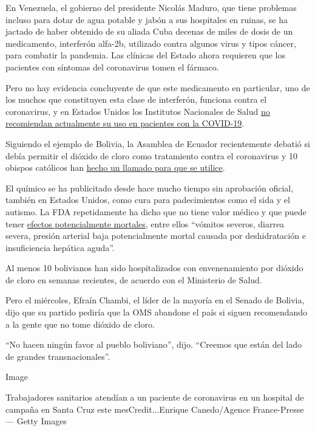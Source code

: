 En Venezuela, el gobierno del presidente Nicolás Maduro, que tiene
problemas incluso para dotar de agua potable y jabón a sus hospitales en
ruinas, se ha jactado de haber obtenido de su aliada Cuba decenas de
miles de dosis de un medicamento, interferón alfa-2b, utilizado contra
algunos virus y tipos cáncer, para combatir la pandemia. Las clínicas
del Estado ahora requieren que los pacientes con síntomas del
coronavirus tomen el fármaco.

Pero no hay evidencia concluyente de que este medicamento en particular,
uno de los muchos que constituyen esta clase de interferón, funciona
contra el coronavirus, y en Estados Unidos los Institutos Nacionales de
Salud
\href{https://www.covid19treatmentguidelines.nih.gov/immune-based-therapy/immunomodulators/interferons/}{no
recomiendan actualmente su uso en pacientes con la COVID-19}.

Siguiendo el ejemplo de Bolivia, la Asamblea de Ecuador recientemente
debatió si debía permitir el dióxido de cloro como tratamiento contra el
coronavirus y 10 obispos católicos han
\href{https://www.ecuavisa.com/articulo/noticias/nacional/621671-obispos-solicitan-renuncia-del-ministro-salud}{hecho
un llamado para que se utilice}.

El químico se ha publicitado desde hace mucho tiempo sin aprobación
oficial, también en Estados Unidos, como cura para padecimientos como el
sida y el autismo. La FDA repetidamente ha dicho que no tiene valor
médico y que puede tener
\href{https://web.archive.org/web/20190814102219/https:/www.fda.gov/news-events/press-announcements/fda-warns-consumers-about-dangerous-and-potentially-life-threating-side-effects-miracle-mineral}{efectos
potencialmente mortales}, entre ellos ``vómitos severos, diarrea severa,
presión arterial baja potencialmente mortal causada por deshidratación e
insuficiencia hepática aguda''.

Al menos 10 bolivianos han sido hospitalizados con envenenamiento por
dióxido de cloro en semanas recientes, de acuerdo con el Ministerio de
Salud.

Pero el miércoles, Efraín Chambi, el líder de la mayoría en el Senado de
Bolivia, dijo que su partido pediría que la OMS abandone el país si
siguen recomendando a la gente que no tome dióxido de cloro.

``No hacen ningún favor al pueblo boliviano'', dijo. ``Creemos que están
del lado de grandes transnacionales''.

Image

Trabajadores sanitarios atendían a un paciente de coronavirus en un
hospital de campaña en Santa Cruz este mesCredit...Enrique Canedo/Agence
France-Presse --- Getty Images

